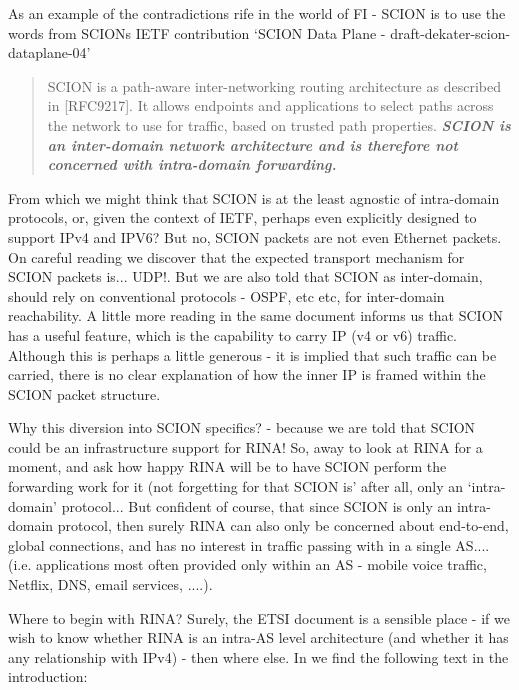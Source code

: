 As an example of the contradictions rife in the world of FI - SCION is to use the words from SCIONs IETF  contribution `SCION Data Plane - draft-dekater-scion-dataplane-04' \cite{scion-ietf}
\begin{quote}
	SCION is a path-aware inter-networking routing architecture as
	described in [RFC9217].  It allows endpoints and applications to
	select paths across the network to use for traffic, based on trusted
	path properties.  \textbf{\textit{SCION is an inter-domain network architecture and
			is therefore not concerned with intra-domain forwarding.}}
\end{quote}
From which we might think that SCION is at the least agnostic of intra-domain protocols, or, given the context of IETF, perhaps even explicitly designed to support IPv4 and IPV6?  But no, SCION packets are not even Ethernet packets.  On careful reading we discover that the expected transport mechanism for SCION packets is... UDP!. But we are also told that SCION as inter-domain, should rely on conventional protocols - OSPF, etc etc, for inter-domain reachability.  A little more reading in the same document informs us that SCION has a useful feature, which is the capability to carry IP (v4 or v6) traffic.  Although this is perhaps a little generous - it is implied that such traffic can be carried, there is no clear explanation of how the inner IP is framed within the SCION packet structure.

Why this diversion into SCION specifics? - because we are told that SCION could be an infrastructure support for RINA!
So, away to look at RINA for a moment, and ask how happy RINA will be to have SCION perform the forwarding work for it (not forgetting for that SCION is' after all, only an `intra-domain' protocol...
But confident of course, that since SCION is only an intra-domain protocol, then surely RINA can also only be concerned about end-to-end, global connections, and has no interest in traffic passing with in a single AS.... (i.e.  applications most often provided only within an AS - mobile voice traffic, Netflix, DNS, email services, ....).

Where to begin with RINA?  Surely, the ETSI document is a sensible place - if we wish to know whether RINA is an intra-AS level architecture (and whether it has any relationship with IPv4) - then where else.
In  we find the following text in the introduction:

